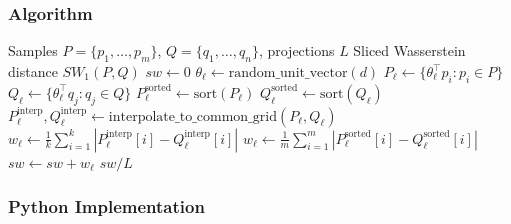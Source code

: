 \subsubsection{Algorithm}

\begin{algorithm}[H]
\caption{Sliced Wasserstein Distance}
\label{alg:sliced-wasserstein}
\begin{algorithmic}[1]
\Require Samples $P = \{p_1, \ldots, p_m\}$, $Q = \{q_1, \ldots, q_n\}$, projections $L$
\Ensure Sliced Wasserstein distance $SW_1(P, Q)$
\State $sw \gets 0$
    \State $\theta_\ell \gets \text{random\_unit\_vector}(d)$ 
    \State $P_\ell \gets \{\theta_\ell^\top p_i : p_i \in P\}$ 
    \State $Q_\ell \gets \{\theta_\ell^\top q_j : q_j \in Q\}$ 
    \State $P_\ell^{\text{sorted}} \gets \text{sort}(P_\ell)$
    \State $Q_\ell^{\text{sorted}} \gets \text{sort}(Q_\ell)$
     
        \State $P_\ell^{\text{interp}}, Q_\ell^{\text{interp}} \gets \text{interpolate\_to\_common\_grid}(P_\ell, Q_\ell)$
        \State $w_\ell \gets \frac{1}{k}\sum_{i=1}^{k} |P_\ell^{\text{interp}}[i] - Q_\ell^{\text{interp}}[i]|$
    \Else
        \State $w_\ell \gets \frac{1}{m}\sum_{i=1}^{m} |P_\ell^{\text{sorted}}[i] - Q_\ell^{\text{sorted}}[i]|$
    \EndIf
    \State $sw \gets sw + w_\ell$
\EndFor
\State \Return $sw / L$
\end{algorithmic}
\end{algorithm}

\subsubsection{Python Implementation}

